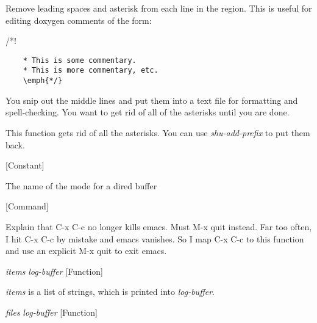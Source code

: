 \begin{doc-string}
Remove leading spaces and asterisk from each line in the region.  This is
useful for editing doxygen comments of the form:

   /*!
\small{\begin{verbatim}
    * This is some commentary.
    * This is more commentary, etc.
    \emph{*/}
\end{verbatim}}

You snip out the middle lines and put them into a text file for formatting and
spell-checking.  You want to get rid of all of the asterisks until you are
done.

This function gets rid of all the asterisks.  You can use \emph{shu-add-prefix} to
put them back.
\end{doc-string}

\vspace{1em}
\noindent
{}
\usebox{\funcname}
 \hfill [Constant]

\begin{doc-string}
The name of the mode for a dired buffer
\end{doc-string}

\vspace{1em}
\noindent
{}
\usebox{\funcname}
 \hfill [Command]

\begin{doc-string}
Explain that C-x C-c no longer kills emacs.  Must M-x quit instead.
Far too often, I hit C-x C-c by mistake and emacs vanishes.  So I map
C-x C-c to this function and use an explicit M-x quit to exit emacs.
\end{doc-string}

\vspace{1em}
\noindent
{}
\usebox{\funcname}\emph{items} \emph{log-buffer}
 \hfill [Function]

\begin{doc-string}
\emph{items} is a list of strings, which is printed into \emph{log-buffer}.
\end{doc-string}

\vspace{1em}
\noindent
{}
\usebox{\funcname}\emph{files} \emph{log-buffer}
 \hfill [Function]

